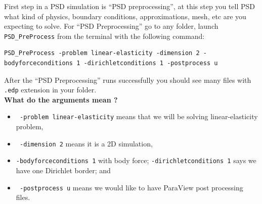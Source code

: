 First step in a PSD simulation is ``PSD preprocessing'', at this step you tell PSD what kind of physics, boundary conditions, approximations, mesh, etc are you expecting to solve.
For ``PSD Preprocessing'' go to any folder, launch \lstinline[style=Linux]!PSD_PreProcess! from the terminal with the following command:
\begin{lstlisting}[style=Linux]  
PSD_PreProcess -problem linear-elasticity -dimension 2 -bodyforceconditions 1 -dirichletconditions 1 -postprocess u
\end{lstlisting}
%
After the ``PSD Preprocessing'' runs successfully you should see many files with \lstinline[style=Linux]!.edp! extension in your folder.\\
\noindent\textbf{What do the arguments mean ?}
\begin{itemize}
	\item \lstinline[style=Linux]! -problem linear-elasticity! means that we will be solving linear-elasticity problem,
	\item \lstinline[style=Linux]! -dimension 2! means it is a 2D simulation, 
	\item \lstinline[style=Linux]!-bodyforceconditions 1! with body force; \lstinline[style=Linux]!-dirichletconditions 1! says we have one Dirichlet border; and 
	\item \lstinline[style=Linux]! -postprocess u! means we would like to have ParaView post processing files.
\end{itemize}    

